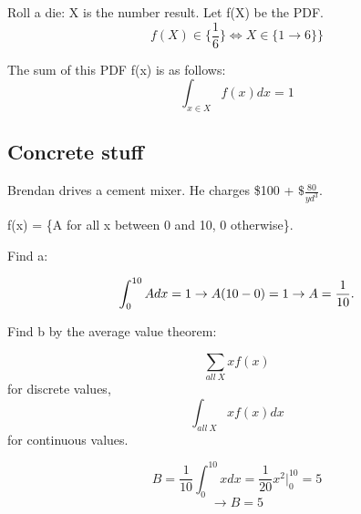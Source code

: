 \documentclass[]{article}
\begin{document}
	Roll a die: X is the number result. Let f(X) be the PDF. $$f(X) \in \{\dfrac{1}{6}\}\iff X\in\{1\to 6\}\}$$
	
	The sum of this PDF f(x) is as follows:
	\[\int_{x\in X}^{}f(x)dx = 1\]
	
	\subsection{Concrete stuff}
	Brendan drives a cement mixer. He charges \$100 + $\$\frac{80}{yd^3}$.
	
	f(x) = \{A for all x between 0 and 10, 0 otherwise\}.
	
	Find a:
	
	$$\int_0^{10}Adx = 1 \\
	\to A(10 - 0) = 1 \\
	\to A = \frac{1}{10}.$$
	
	Find b by the average value theorem:
	
	$$\sum_{all\ X}xf(x)$$ for discrete values,
	$$\int_{all\ X}xf(x)dx$$ for continuous values.
	
	$$ B = \frac{1}{10}\int_{0}^{10}xdx = \frac{1}{20}x^2|^{10}_{0} = 5$$
	$$\to B = 5$$
	
\end{document}
